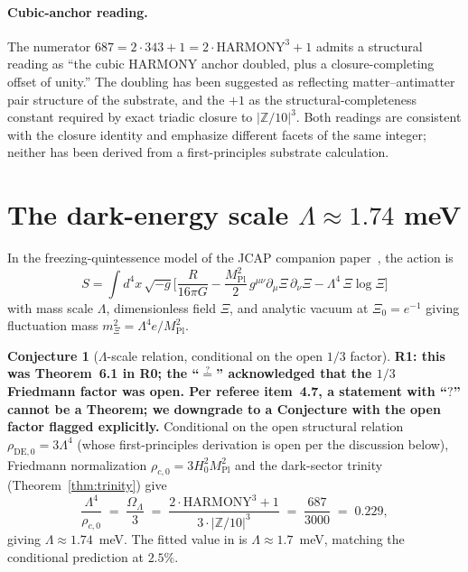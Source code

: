\documentclass[11pt,reqno]{amsart}
\theoremstyle{plain}
\theoremstyle{definition}
\newtheorem{conjecture}[theorem]{Conjecture}
\theoremstyle{remark}
\newcommand{\Z}{\mathbb{Z}}
\begin{document}
\paragraph{Cubic-anchor reading.}
The numerator $687 = 2 \cdot 343 + 1 = 2 \cdot \mathrm{HARMONY}^{3} + 1$
admits a structural reading as ``the cubic $\mathrm{HARMONY}$
anchor doubled, plus a closure-completing offset of unity.''
The doubling has been suggested as reflecting matter--antimatter
pair structure of the substrate, and the $+1$ as the
structural-completeness constant required by exact triadic
closure to $|\Z/10|^{3}$. Both readings are consistent with the
closure identity and emphasize different facets of the same
integer; neither has been derived from a first-principles
substrate calculation.

\section{The dark-energy scale $\Lambda \approx 1.74$ meV}\label{sec:lambda}

In the freezing-quintessence model of the JCAP companion
paper~\cite{SandersGish2026JCAP}, the action is
\[
  S = \int d^{4}x\,\sqrt{-g}\Big[\frac{R}{16\pi G}
     - \frac{M_\mathrm{Pl}^{2}}{2}\,g^{\mu\nu}\partial_\mu\Xi\,\partial_\nu\Xi
     - \Lambda^{4}\,\Xi\log\Xi\Big]
\]
with mass scale $\Lambda$, dimensionless field $\Xi$, and analytic
vacuum at $\Xi_0 = e^{-1}$ giving fluctuation mass
$m_\Xi^{2} = \Lambda^{4} e / M_\mathrm{Pl}^{2}$.

\begin{conjecture}[$\Lambda$-scale relation, conditional on the open $1/3$ factor]\label{thm:lambda-scale}
\textbf{R1: this was Theorem~6.1 in R0; the ``$\stackrel{?}{=}$''
acknowledged that the $1/3$ Friedmann factor was open. Per
referee item~4.7, a statement with ``$?$'' cannot be a Theorem;
we downgrade to a Conjecture with the open factor flagged
explicitly.} Conditional on the open structural relation
$\rho_{\mathrm{DE},0} = 3\Lambda^4$ (whose first-principles
derivation is open per the discussion below), Friedmann
normalization $\rho_{c,0} = 3 H_{0}^{2} M_\mathrm{Pl}^{2}$ and the
dark-sector trinity (Theorem~\ref{thm:trinity}) give
\[
  \frac{\Lambda^{4}}{\rho_{c,0}}
  \;=\;
  \frac{\Omega_\Lambda}{3}
  \;=\;
  \frac{2\cdot\mathrm{HARMONY}^{3} + 1}{3 \cdot |\Z/10|^{3}}
  \;=\; \frac{687}{3000}
  \;=\; 0.229,
\]
giving $\Lambda \approx 1.74$~meV. The fitted value in
\cite{SandersGish2026JCAP} is $\Lambda \approx 1.7$~meV,
matching the conditional prediction at $2.5\%$.
\end{conjecture}
\end{document}
